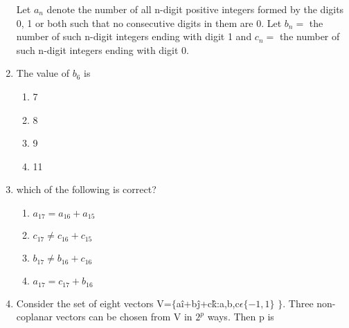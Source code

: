 \begin{enumerate}[label=\arabic*.,ref=\thesubsection.\theenumi]
Let $a_n$ denote the number of all n-digit positive integers formed by the digits 0, 1 or both such that no consecutive digits in them are 0. Let $b_n=$ the number of such n-digit integers ending with digit 1 and $c_n=$ the number of such n-digit integers ending with digit 0.\\
\item The value of $b_6$ is
\begin{enumerate}
\item 7
\item 8
\item 9
\item 11\\
\end{enumerate}
\item which of the following is correct?
\begin{enumerate}
\item $a_{17} = a_{16} + a_{15}$
\item $c_{17} \neq c_{16} + c_{15}$
\item $b_{17} \neq b_{16} + c_{16}$
\item $a_{17} = c_{17} + b_{16}$\\
\end{enumerate}
\item Consider the set of eight vectors V=$\lbrace$a\^{i}+b\^{j}+c\^{k}:a,b,c$\epsilon\lbrace-1,1\rbrace$ $\rbrace.$ Three non-coplanar vectors can be chosen from V in $2^p$ ways. Then p is\\


\end{enumerate}
